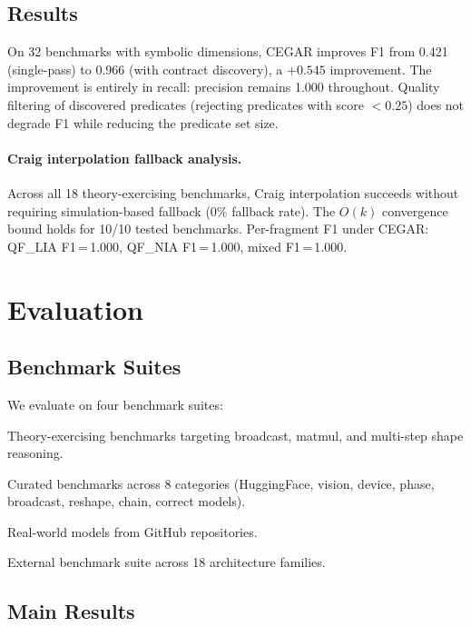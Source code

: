 \documentclass[11pt]{article}
\begin{document}
\subsection{Results}

On 32 benchmarks with symbolic dimensions, CEGAR improves
F1 from 0.421 (single-pass) to 0.966 (with contract discovery),
a $+0.545$ improvement.  The improvement is entirely in recall:
precision remains 1.000 throughout.  Quality filtering of
discovered predicates (rejecting predicates with score $< 0.25$)
does not degrade F1 while reducing the predicate set size.

\paragraph{Craig interpolation fallback analysis.}
Across all 18 theory-exercising benchmarks, Craig interpolation
succeeds without requiring simulation-based fallback (0\% fallback
rate).  The $O(k)$ convergence bound holds for 10/10 tested
benchmarks.  Per-fragment F1 under CEGAR: QF\_LIA F1\,=\,1.000,
QF\_NIA F1\,=\,1.000, mixed F1\,=\,1.000.


\section{Evaluation}\label{sec:eval}

\subsection{Benchmark Suites}

We evaluate on four benchmark suites:
\begin{description}[leftmargin=2em,style=nextline]
  \item[Suite A (18 benchmarks):] Theory-exercising benchmarks
    targeting broadcast, matmul, and multi-step shape reasoning.
  \item[Suite B (230 benchmarks):] Curated benchmarks across
    8 categories (HuggingFace, vision, device, phase, broadcast,
    reshape, chain, correct models).
  \item[Suite C (56 benchmarks):] Real-world models from
    GitHub repositories.
  \item[Suite D (50 benchmarks):] External benchmark suite
    across 18 architecture families.
\end{description}

\subsection{Main Results}
\end{document}
